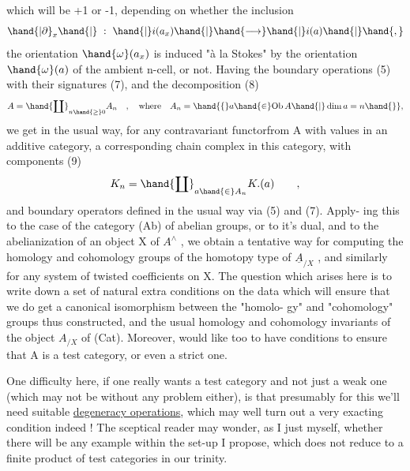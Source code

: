 which will be +1 or -1, depending on whether the inclusion
\[ \hand{|\partial}_x\hand{|} \ : \ \hand{|}i(a_x)\hand{|} \hand{\longrightarrow} \hand{|}i(a)\hand{|}\hand{,} \]
the orientation $\hand{\omega}(a_x)$ is induced "à la Stokes" by the orientation $\hand{\omega}(a)$
of the ambient n-cell, or not. Having the boundary operations (5)
with their signatures (7),  and the decomposition
(8) \[ A = \hand{\coprod}_{n \hand{\geq} 0} A_n \quad , \quad \text{where} \quad A_n = \hand{\{} a \hand{\in} \mathrm{Ob}\, A \hand{|} \dim a = n \hand{\}}, \]
we get in the usual way, for any contravariant functorfrom A with
values in an additive category, a corresponding
chain complex in this category, with components
(9) \[ K_n = \hand{\coprod}_{a \hand{\in} A_n} K.(a) \qquad , \]
and boundary operators defined in the usual way via (5) and (7). Apply-%
ing this to the case of the category (Ab) of abelian groups, or to it's
dual,  and to the abelianization of an object X of $A^{\wedge}$ , we obtain
a tentative way for computing the homology and cohomology groups of
the homotopy type of $\underline{A}_{/X}$ , and similarly for any system of twisted
coefficients on X. The question which arises here is to write down
 a set of natural extra conditions on the data\hand{,}  which 
will ensure that we do get a canonical isomorphism between the "homolo-%
gy" and "cohomology" groups thus constructed, and the usual homology
and cohomology invariants of the object $A_{/X}$ of (Cat). Moreover, 
would like too to have conditions to ensure that A is a test category,
or even a strict one.\hand{$\|$}

One difficulty here, if one really wants a test
category and not just a weak one (which may not be without any problem
either), is that presumably for this we'll need suitable \uline{degeneracy
operations}, which may  well turn out a very exacting condition
indeed ! The sceptical reader may wonder, as I just  myself,
whether there will be any example within the set-up I propose, which
does not reduce to a finite product of test categories in our trinity.

